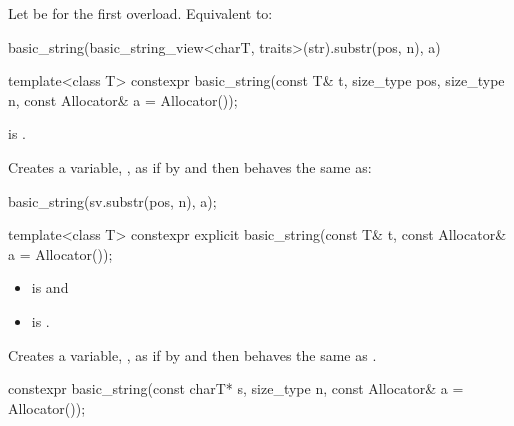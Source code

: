 \begin{itemdescr}
\pnum
\effects
Let  be  for the first overload. Equivalent to:
\begin{codeblock}
basic_string(basic_string_view<charT, traits>(str).substr(pos, n), a)
\end{codeblock}
\end{itemdescr}

%
\begin{itemdecl}
template<class T>
  constexpr basic_string(const T& t, size_type pos, size_type n, const Allocator& a = Allocator());
\end{itemdecl}

\begin{itemdescr}
\pnum
\constraints
{}
is .

\pnum
\effects
Creates a variable, ,
as if by 
and then behaves the same as:
\begin{codeblock}
basic_string(sv.substr(pos, n), a);
\end{codeblock}
\end{itemdescr}

%
\begin{itemdecl}
template<class T>
  constexpr explicit basic_string(const T& t, const Allocator& a = Allocator());
\end{itemdecl}

\begin{itemdescr}
\pnum
\constraints
\begin{itemize}
\item
{} is
 and
\item
{} is
.
\end{itemize}

\pnum
\effects
Creates a variable, , as if by
 and
then behaves the same as .
\end{itemdescr}

%
\begin{itemdecl}
constexpr basic_string(const charT* s, size_type n, const Allocator& a = Allocator());
\end{itemdecl}

